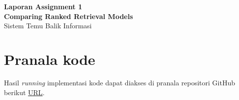 \documentclass[12pt, a4paper]{article}
\begin{document}
\begin{center}
    \large \textbf{Laporan Assignment 1 \\ Comparing Ranked Retrieval Models} \\[0.2cm]
    \large Sistem Temu Balik Informasi  \\[0.5cm]
\end{center}

\section{Pranala kode}
Hasil \textit{running} implementasi kode dapat diakses di pranala repositori GitHub berikut \url{URL}.
\end{document}
